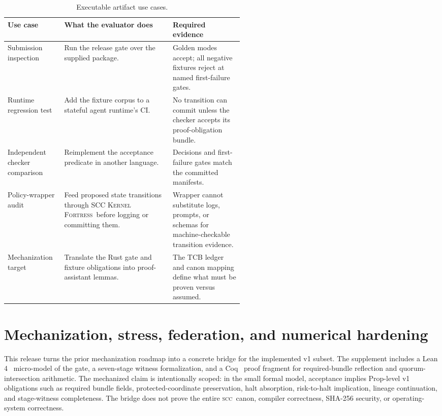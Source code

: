 \documentclass{article}
\newcommand{\SCC}{\textsc{scc}}
\newcommand{\KF}{\textsc{SCC Kernel Fortress}}
\begin{document}
\begin{table}[h]
\caption{Executable artifact use cases.}
\label{tab:usecases}
\centering
\footnotesize
\begin{tabularx}{\linewidth}{p{0.24\linewidth}Yp{0.30\linewidth}}
\toprule
Use case & What the evaluator does & Required evidence \\
\midrule
Submission inspection & Run the release gate over the supplied package. & Golden modes accept; all negative fixtures reject at named first-failure gates. \\
Runtime regression test & Add the fixture corpus to a stateful agent runtime's CI. & No transition can commit unless the checker accepts its proof-obligation bundle. \\
Independent checker comparison & Reimplement the acceptance predicate in another language. & Decisions and first-failure gates match the committed manifests. \\
Policy-wrapper audit & Feed proposed state transitions through \KF\ before logging or committing them. & Wrapper cannot substitute logs, prompts, or schemas for machine-checkable transition evidence. \\
Mechanization target & Translate the Rust gate and fixture obligations into proof-assistant lemmas. & The TCB ledger and canon mapping define what must be proven versus assumed. \\
\bottomrule
\end{tabularx}
\end{table}


\section{Mechanization, stress, federation, and numerical hardening}
\label{sec:mech-hardening}
This release turns the prior mechanization roadmap into a concrete bridge for the implemented v1 subset. The supplement includes a Lean 4~\citep{lean4} micro-model of the gate, a seven-stage witness formalization, and a Coq~\citep{coq} proof fragment for required-bundle reflection and quorum-intersection arithmetic. The mechanized claim is intentionally scoped: in the small formal model, acceptance implies Prop-level v1 obligations such as required bundle fields, protected-coordinate preservation, halt absorption, risk-to-halt implication, lineage continuation, and stage-witness completeness. The bridge does not prove the entire \SCC\ canon, compiler correctness, SHA-256 security, or operating-system correctness.
\end{document}

